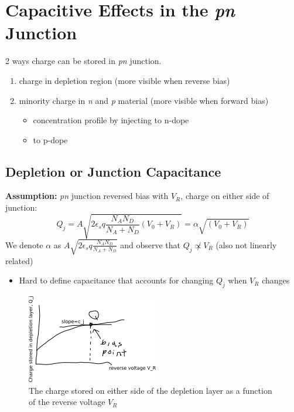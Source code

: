 \documentclass{report}
\begin{document}
\section{Capacitive Effects in the \textit{pn} Junction}

2 ways charge can be stored in \textit{pn} junction.
\begin{enumerate}
	\item charge in depletion region (more visible when reverse bias)
	\item minority charge in \textit{n} and \textit{p} material (more visible when forward bias)
	\begin{itemize}
		\item concentration profile by injecting to n-dope
		\item {}\phantom{concentration profile by injecting} to p-dope
	\end{itemize}
\end{enumerate}

\subsection{Depletion or Junction Capacitance}

\textbf{Assumption:} \textit{pn} junction reversed bias with $V_R$, charge on either side of junction:
\begin{equation}
	Q_j = A \sqrt{2\epsilon_s q \frac{N_A N_D}{N_A + N_D} \left(V_0 + V_R\right)} = \alpha \sqrt{\left(V_0 + V_R\right)}
	\label{eq:3.6-alpha-v0-vr}
\end{equation}
We denote $\alpha$ as $A \sqrt{2\epsilon_s q \frac{N_A N_D}{N_A + N_D}}$ and observe that $Q_j \not\propto V_R$ (also not linearly related)
\begin{itemize}
	\item Hard to define capacitance that accounts for changing $Q_j$ when $V_R$ changes
\end{itemize}

\begin{figure}[!hbpt]
	\centering
	\includegraphics{path172092.png}
	\caption{The charge stored on either side of the depletion layer as a function of the reverse voltage $V_R$}
	\label{fig:charge-volt-cap-graph}
\end{figure}
\end{document}
